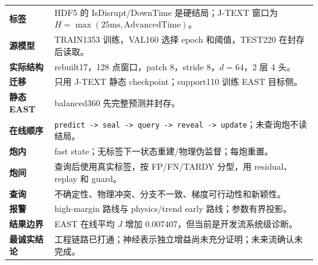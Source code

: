 \documentclass[11pt,a4paper]{article}
\newcommand{\code}[1]{\texttt{\small #1}}
\begin{document}
\begin{tabularx}{\textwidth}{>{\bfseries}p{23mm}Y}
标签 & HDF5 的 IsDisrupt/DownTime 是硬结局；J-TEXT 窗口为
\(H=\max(25\mathrm{ms},\mathrm{AdvancedTime})\)。\\
源模型 & TRAIN1353 训练，VAL160 选择 epoch 和阈值，TEST220 在封存后读取。\\
实际结构 & rebuilt17，128 点窗口，patch 8，stride 8，\(d=64\)，2 层 4 头。\\
迁移 & 只用 J-TEXT 静态 checkpoint；support110 训练 EAST 目标侧。\\
静态 EAST & balanced360 先完整预测并封存。\\
在线顺序 & \code{predict -> seal -> query -> reveal -> update}；未查询炮不读结局。\\
炮内 & fast state；无标签下一状态重建/物理伪监督；每炮重置。\\
炮间 & 查询后使用真实标签，按 FP/FN/TARDY 分型，用 residual、replay 和 guard。\\
查询 & 不确定性、物理冲突、分支不一致、梯度可行动性和新颖性。\\
报警 & high-margin 路线与 physics/trend early 路线；参数有界投影。\\
结果边界 & EAST 在线平均 \(J\) 增加 0.007407，但当前是开发流系统级诊断。\\
最诚实结论 & 工程链路已打通；神经表示独立增益尚未充分证明；未来流确认未完成。\\
\end{tabularx}
\end{document}
